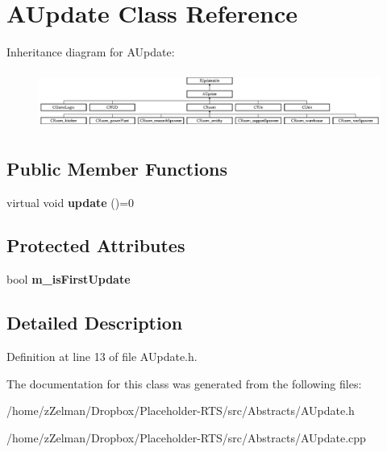 \hypertarget{classAUpdate}{\section{A\-Update Class Reference}
\label{classAUpdate}
}
Inheritance diagram for A\-Update\-:\begin{figure}[H]
\begin{center}
\leavevmode
\includegraphics[height=1.904762cm]{classAUpdate}
\end{center}
\end{figure}
\subsection*{Public Member Functions}
\begin{DoxyCompactItemize}
\item 
\hypertarget{classAUpdate_a9f5be387e467fc5eea7fc45882abd949}{virtual void {\bfseries update} ()=0}\label{classAUpdate_a9f5be387e467fc5eea7fc45882abd949}

\end{DoxyCompactItemize}
\subsection*{Protected Attributes}
\begin{DoxyCompactItemize}
\item 
\hypertarget{classAUpdate_adf0a017c2fd5abd12f64f7f0fd992e66}{bool {\bfseries m\-\_\-is\-First\-Update}}\label{classAUpdate_adf0a017c2fd5abd12f64f7f0fd992e66}

\end{DoxyCompactItemize}


\subsection{Detailed Description}


Definition at line 13 of file A\-Update.\-h.



The documentation for this class was generated from the following files\-:\begin{DoxyCompactItemize}
\item 
/home/z\-Zelman/\-Dropbox/\-Placeholder-\/\-R\-T\-S/src/\-Abstracts/A\-Update.\-h\item 
/home/z\-Zelman/\-Dropbox/\-Placeholder-\/\-R\-T\-S/src/\-Abstracts/A\-Update.\-cpp\end{DoxyCompactItemize}
